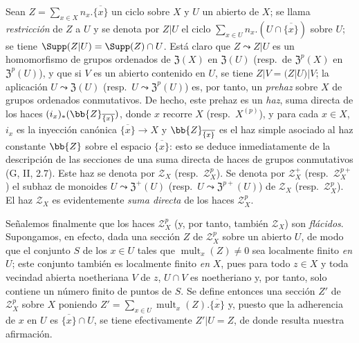 \begin{env}[21.6.3]
\label{IV.21.6.3}
Sean $Z=\sum_{x\in X}n_x.\overline{\{x\}}$ un ciclo sobre $X$ y $U$ un abierto de $X$;
se llama \emph{restricción} de $Z$ a $U$ y se denota por $Z|U$ el ciclo $\sum_{x\in U}n_x.(U\cap\overline{\{x\}})$ sobre $U$;
se tiene $\Supp(Z|U)=\Supp(Z)\cap U$.
Está claro que $Z\leadsto Z|U$ es un homomorfismo de grupos ordenados de $\mathfrak{Z}(X)$ en $\mathfrak{Z}(U)$ (resp.\ de $\mathfrak{Z}^p(X)$ en $\mathfrak{Z}^p(U)$), y que si $V$ es un abierto contenido en $U$, se tiene $Z|V=(Z|U)|V$;
la aplicación $U\leadsto\mathfrak{Z}(U)$ (resp.\ $U\leadsto\mathfrak{Z}^p(U)$) es, por tanto, un \emph{prehaz} sobre $X$ de grupos ordenados conmutativos.
De hecho, este prehaz es un \emph{haz}, suma directa de los haces $(i_x)_*(\bb{Z}_{\overline{\{x\}}})$, donde $x$ recorre $X$ (resp.\ $X^{(p)}$), y para cada $x\in X$, $i_x$ es la inyección canónica $\overline{\{x\}}\to X$ y $\bb{Z}_{\overline{\{x\}}}$ es el haz simple asociado al haz constante $\bb{Z}$ sobre el espacio $\overline{\{x\}}$:
esto se deduce inmediatamente de la descripción de las secciones de una suma directa de haces de grupos conmutativos (G, II, 2.7).
Este haz se denota por $\mathscr{Z}_X$ (resp.\ $\mathscr{Z}_X^p$).
Se denota por $\mathscr{Z}_X^+$ (resp.\ $\mathscr{Z}_X^{p+}$) el subhaz
de monoides $U\leadsto\mathfrak{Z}^+(U)$ (resp.\ $U\leadsto\mathfrak{Z}^{p+}(U)$) de $\mathscr{Z}_X$ (resp.\ $\mathscr{Z}_X^p$).
El haz $\mathscr{Z}_X$ es evidentemente \emph{suma directa} de los haces $\mathscr{Z}_X^p$.

Señalemos finalmente que los haces $\mathscr{Z}_X^p$ (y, por tanto, también $\mathscr{Z}_X$) son \emph{flácidos}.
Supongamos, en efecto, dada una sección $Z$ de $\mathscr{Z}_X^p$ sobre un abierto $U$, de modo que el conjunto $S$ de los $x\in U$ tales que $\operatorname{mult}_x(Z)\neq0$ sea localmente finito \emph{en} $U$;
este conjunto también es localmente finito \emph{en} $X$, pues para todo $z\in X$ y toda vecindad abierta noetheriana $V$ de $z$, $U\cap V$ es noetheriano y, por tanto, solo contiene un número finito de puntos de $S$.
Se define entonces una sección $Z'$ de $\mathscr{Z}_X^p$ sobre $X$ poniendo $Z'=\sum_{x\in U}\operatorname{mult}_x(Z).\overline{\{x\}}$ y, puesto que la adherencia de $x$ en $U$ es $\overline{\{x\}}\cap U$, se tiene efectivamente $Z'|U=Z$, de donde resulta nuestra afirmación.
\end{env}

